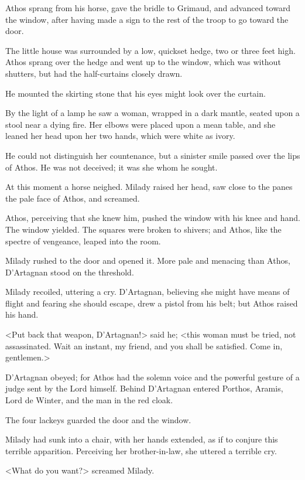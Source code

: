 Athos sprang from his horse, gave the bridle to Grimaud, and advanced toward the window, after having made a sign to the rest of the troop to go toward the door. 

The little house was surrounded by a low, quickset hedge, two or three feet high. Athos sprang over the hedge and went up to the window, which was without shutters, but had the half-curtains closely drawn. 

He mounted the skirting stone that his eyes might look over the curtain. 

By the light of a lamp he saw a woman, wrapped in a dark mantle, seated upon a stool near a dying fire. Her elbows were placed upon a mean table, and she leaned her head upon her two hands, which were white as ivory. 

He could not distinguish her countenance, but a sinister smile passed over the lips of Athos. He was not deceived; it was she whom he sought. 

At this moment a horse neighed. Milady raised her head, saw close to the panes the pale face of Athos, and screamed. 

Athos, perceiving that she knew him, pushed the window with his knee and hand. The window yielded. The squares were broken to shivers; and Athos, like the spectre of vengeance, leaped into the room. 

Milady rushed to the door and opened it. More pale and menacing than Athos, D'Artagnan stood on the threshold. 

Milady recoiled, uttering a cry. D'Artagnan, believing she might have means of flight and fearing she should escape, drew a pistol from his belt; but Athos raised his hand. 

<Put back that weapon, D'Artagnan!> said he; <this woman must be tried, not assassinated. Wait an instant, my friend, and you shall be satisfied. Come in, gentlemen.> 

D'Artagnan obeyed; for Athos had the solemn voice and the powerful gesture of a judge sent by the Lord himself. Behind D'Artagnan entered Porthos, Aramis, Lord de Winter, and the man in the red cloak. 

The four lackeys guarded the door and the window. 

Milady had sunk into a chair, with her hands extended, as if to conjure this terrible apparition. Perceiving her brother-in-law, she uttered a terrible cry. 

<What do you want?> screamed Milady. 

